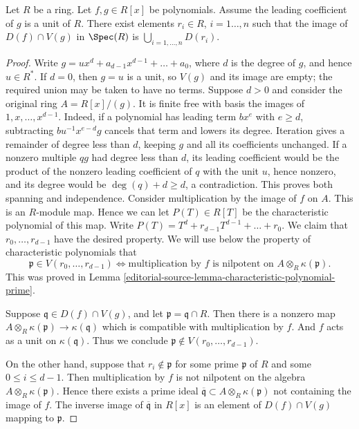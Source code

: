 \begin{lemma}
\label{editorial-source-lemma-affineline-special}
Let $R$ be a ring. Let $f, g \in R[x]$ be polynomials.
Assume the leading coefficient of $g$ is a unit of $R$.
There exist elements $r_i\in R$, $i = 1\ldots, n$ such that
the image of $D(f) \cap V(g)$ in $\Spec(R)$ is
$\bigcup_{i = 1, \ldots, n} D(r_i)$.
\end{lemma}

\begin{proof}
Write $g = ux^d + a_{d-1}x^{d-1} + \ldots + a_0$, where
$d$ is the degree of $g$, and hence $u \in R^*$.
If $d=0$, then $g=u$ is a unit, so $V(g)$ and its image are empty;
the required union may be taken to have no terms. Suppose $d>0$ and
consider the original ring $A=R[x]/(g)$. It is finite free with basis
the images of $1,x,\ldots,x^{d-1}$. Indeed, if a polynomial has leading
term $bx^e$ with $e\geq d$, subtracting
$bu^{-1}x^{e-d}g$ cancels that term and lowers its degree. Iteration
gives a remainder of degree less than $d$, keeping $g$ and all its
coefficients unchanged. If a nonzero multiple $qg$ had degree less
than $d$, its leading coefficient would be the product of the nonzero
leading coefficient of $q$ with the unit $u$, hence nonzero, and its
degree would be $\deg(q)+d\geq d$, a contradiction. This proves both
spanning and independence. Consider multiplication by the image of
$f$ on $A$. This is an $R$-module map.
Hence we can let $P(T) \in R[T]$ be the characteristic polynomial
of this map. Write $P(T) = T^d + r_{d-1} T^{d-1} + \ldots + r_0$.
We claim that $r_0, \ldots, r_{d-1}$ have the desired property.
We will use below the property of characteristic polynomials
that
$$
\mathfrak p \in V(r_0, \ldots, r_{d-1})
\Leftrightarrow
\text{multiplication by }f\text{ is nilpotent on }
A \otimes_R \kappa(\mathfrak p).
$$
This was proved in Lemma \ref{editorial-source-lemma-characteristic-polynomial-prime}.

\medskip\noindent
Suppose $\mathfrak q\in D(f) \cap V(g)$, and let
$\mathfrak p = \mathfrak q \cap R$. Then there is a nonzero map
$A \otimes_R \kappa(\mathfrak p) \to \kappa(\mathfrak q)$ which
is compatible with multiplication by $f$.
And $f$ acts as a unit on $\kappa(\mathfrak q)$.
Thus we conclude $\mathfrak p \not \in  V(r_0, \ldots, r_{d-1})$.

\medskip\noindent
On the other hand, suppose that $r_i \not\in \mathfrak p$ for some
prime $\mathfrak p$ of $R$ and some $0 \leq i \leq d - 1$.
Then multiplication by $f$ is not nilpotent on the algebra
$A \otimes_R \kappa(\mathfrak p)$.
Hence there exists a prime ideal $\overline{\mathfrak q} \subset
A \otimes_R \kappa(\mathfrak p)$ not containing the image of $f$.
The inverse image of $\overline{\mathfrak q}$ in $R[x]$
is an element of $D(f) \cap V(g)$ mapping to $\mathfrak p$.
\end{proof}